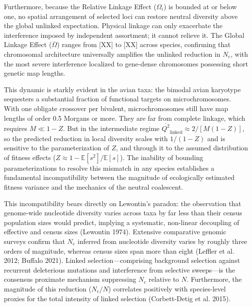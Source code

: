 \documentclass[12pt]{article}
\begin{document}
Furthermore, because the Relative Linkage Effect ($\Omega_i$) is bounded at or below one, no spatial arrangement of selected loci can restore neutral diversity above the global unlinked expectation. Physical linkage can only exacerbate the interference imposed by independent assortment; it cannot relieve it. The Global Linkage Effect ($\overline{\Omega}$) ranges from [XX] to [XX] across species, confirming that chromosomal architecture universally amplifies the unlinked reduction in $N_e$, with the most severe interference localized to gene-dense chromosomes possessing short genetic map lengths.

This dynamic is starkly evident in the avian taxa: the bimodal avian karyotype sequesters a substantial fraction of functional targets on microchromosomes. With one obligate crossover per bivalent, microchromosomes still have map lengths of order 0.5 Morgans or more. They are far from complete linkage, which requires $M \ll 1 - Z$. But in the intermediate regime $\overline{Q^2}_\text{linked} \approx 2/[M(1-Z)]$, so the predicted reduction in local diversity scales with $1/(1-Z)$ and is sensitive to the parameterization of $Z$, and through it to the assumed distribution of fitness effects ($Z \approx 1 - \mathbb{E}[s^2]/\mathbb{E}[s]$). The inability of bounding parameterizations to resolve this mismatch in any species establishes a fundamental incompatibility between the magnitude of ecologically estimated fitness variance and the mechanics of the neutral coalescent.

This incompatibility bears directly on Lewontin’s paradox: the observation that genome-wide nucleotide diversity varies across taxa by far less than their census population sizes would predict, implying a systematic, non-linear decoupling of effective and census sizes (Lewontin 1974). Extensive comparative genomic surveys confirm that $N_e$ inferred from nucleotide diversity varies by roughly three orders of magnitude, whereas census sizes span more than eight (Leffler et al. 2012; Buffalo 2021). Linked selection—comprising background selection against recurrent deleterious mutations and interference from selective sweeps—is the consensus proximate mechanism suppressing $N_e$ relative to $N$. Furthermore, the magnitude of this reduction ($N_e/N$) correlates positively with species-level proxies for the total intensity of linked selection (Corbett-Detig et al. 2015).
\end{document}
